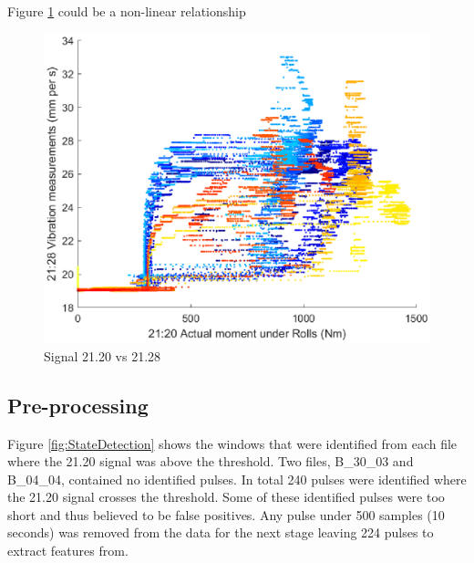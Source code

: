 \documentclass{article}
\begin{document}
Figure \ref{fig:Signal21_20vSignal21_28} could be a non-linear relationship
\begin{figure}[H]
    \centering
    \includegraphics[width=\textwidth, height=\textheight, keepaspectratio]{figures/Signal21_20vSignal21_28.eps}
    \caption{Signal 21.20 vs 21.28}
    \label{fig:Signal21_20vSignal21_28}
\end{figure}	
	
\subsection{Pre-processing}
Figure \ref{fig:StateDetection} shows the windows that were identified from each file where the 21.20 signal was above the threshold. Two files, B\_30\_03 and B\_04\_04, contained no identified pulses. In total 240 pulses were identified where the 21.20 signal crosses the threshold. Some of these identified pulses were too short and thus believed to be false positives. Any pulse under 500 samples (10 seconds) was removed from the data for the next stage leaving 224 pulses to extract features from.
\end{document}
